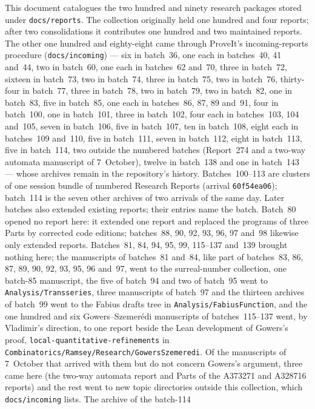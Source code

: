 \documentclass[11pt]{article}
\newcommand{\dir}[1]{\texttt{#1}}
\begin{document}
This document catalogues the two hundred and ninety research packages stored
under \dir{docs/reports}.  The collection originally held one hundred and four reports; after two
consolidations it contributes one hundred and two maintained reports. The
other one hundred and eighty-eight came through ProveIt's incoming-reports procedure
(\dir{docs/incoming}) --- six in batch~36, one each in batches~40, 41
and~44, two in batch~60, one each in batches~62 and~70, three in
batch~72, sixteen in batch~73, two in batch~74, three in batch~75, two in
batch~76, thirty-four in batch~77, three in batch~78, two in
batch~79, two in batch~82, one in batch~83, five in batch~85, one each
in batches~86, 87, 89 and~91, four in batch~100, one in batch~101, three in
batch~102, four each in batches~103, 104 and~105, seven in batch~106,
five in batch~107, ten in batch~108, eight each in batches~109 and~110,
five in batch~111, seven in batch~112, eight in batch~113, five in
batch~114, two outside the numbered batches (Report~274 and a
two-way automata manuscript of 7~October), twelve in batch~138 and one in
batch~143 --- whose
archives remain in the repository's history.  Batches~100--113 are clusters of one session bundle
of numbered Research Reports (arrival \texttt{60f54ea06}); batch~114 is the
seven other archives of two arrivals of the same day.  Later batches
also extended existing reports; their entries name the batch.  Batch~80
opened no report here: it extended one report and replaced the programs of
three Parts by corrected code editions; batches~88, 90, 92, 93, 96, 97
and~98 likewise only extended reports.  Batches~81, 84, 94, 95, 99,
115--137 and~139 brought nothing here; the manuscripts of batches~81 and~84, like part of
batches~83, 86, 87, 89, 90, 92, 93, 95, 96 and~97, went to
the surreal-number collection, one batch-85 manuscript, the five of
batch~94 and two of batch~95 went to
\dir{Analysis/Transseries}, three manuscripts of batch~97 and the
thirteen archives of batch~99 went to the Fabius drafts tree in
\dir{Analysis/FabiusFunction}, and the one hundred and six
Gowers--Szemer\'edi manuscripts of batches~115--137 went, by Vladimir's
direction, to one report beside the Lean development of Gowers's proof,
\dir{local-quantitative-refinements} in
\dir{Combinatorics/Ramsey/Research/GowersSzemeredi}.  Of the manuscripts of
7~October that arrived with them but do not concern Gowers's argument,
three came here (the two-way automata report and Parts of the A373271 and
A328716 reports) and the rest went to new topic directories outside this
collection, which \dir{docs/incoming} lists.  The archive of the batch-114
\end{document}
